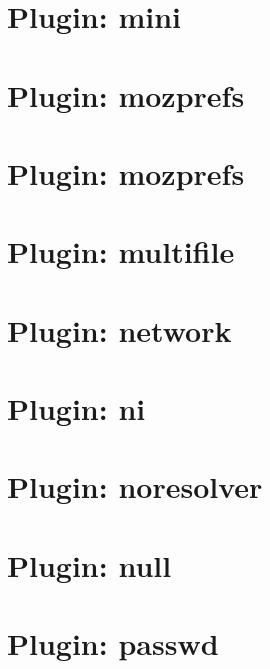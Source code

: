 \documentclass[twoside]{book}
\newcommand{\+}{\discretionary{\mbox{\scriptsize$\hookleftarrow$}}{}{}}
\begin{document}
\chapter{Plugin\+: mini}
\label{md_src_plugins_mini_README}

\chapter{Plugin\+: mozprefs}
\label{md_src_plugins_mozprefs_autoconfig_README}

\chapter{Plugin\+: mozprefs}
\label{md_src_plugins_mozprefs_README}

\chapter{Plugin\+: multifile}
\label{md_src_plugins_multifile_README}

\chapter{Plugin\+: network}
\label{md_src_plugins_network_README}

\chapter{Plugin\+: ni}
\label{md_src_plugins_ni_README}

\chapter{Plugin\+: noresolver}
\label{md_src_plugins_noresolver_README}

\chapter{Plugin\+: null}
\label{md_src_plugins_null_README}

\chapter{Plugin\+: passwd}
\label{md_src_plugins_passwd_README}

\end{document}
